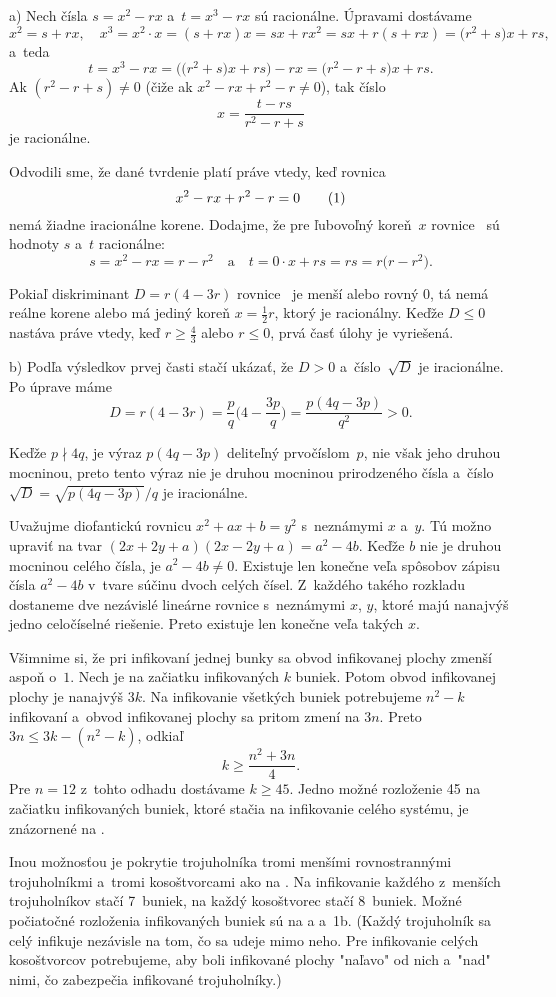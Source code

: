 {%
a) Nech čísla $s=x^2-rx$ a~$t=x^3-rx$ sú racionálne. Úpravami dostávame
$$
x^2=s+rx,\quad x^3=x^2\cdot x=(s+rx)x=sx+rx^2=sx+r(s+rx)=
\bigl(r^2+s\bigr)x+rs,
$$
a~teda
$$
t=x^3-rx=\bigl(\bigl(r^2+s\bigr)x+rs\bigr)-rx=\bigl(r^2-r+s\bigr)x
+rs.
$$
Ak $(r^2-r+s)\ne 0$ (čiže ak $x^2-rx+r^2-r\ne 0$), tak číslo
$$x=\frac{t-rs}{r^2-r+s}$$
je racionálne.

Odvodili sme, že dané tvrdenie platí práve vtedy, keď rovnica
$$
x^2-rx+r^2-r=0
\tag1
$$
nemá žiadne iracionálne korene. Dodajme, že pre ľubovoľný koreň~$x$ rovnice~ sú hodnoty $s$ a~$t$ racionálne:
$$
s=x^2-rx=r-r^2\quad\text{a}\quad
t=0\cdot x+rs=rs=r\bigl(r-r^2\bigr).
$$

Pokiaľ diskriminant $D=r(4-3r)$ rovnice~ je menší alebo rovný $0$, tá
nemá reálne korene alebo má jediný koreň $x=\frac 12r$, ktorý je racionálny. Keďže $D\le 0$ nastáva práve vtedy, keď $r\ge\frac43$ alebo $r\le 0$, prvá časť úlohy je vyriešená.

\smallskip
b)
Podľa výsledkov prvej časti stačí ukázať, že $D>0$ a~číslo~$\sqrt D$ je iracionálne.
Po úprave máme
$$
D=r(4-3r)=\frac{p}{q}\biggl(4-\frac{3p}{q}\biggr)=
\frac{p(4q-3p)}{q^2}>0.
$$

Keďže $p\nmid 4q$, je výraz $p(4q-3p)$ deliteľný prvočíslom~$p$, nie však jeho druhou mocninou, preto tento výraz nie je druhou mocninou prirodzeného čísla a~číslo~$\sqrt D=\sqrt{p(4q-3p)}/q$ je iracionálne.
}

{%
Uvažujme diofantickú rovnicu $x^2+ax+b=y^2$ s~neznámymi $x$ a~$y$. Tú možno upraviť na tvar $(2x+2y+a)(2x-2y+a)=a^2-4b$.
Keďže $b$ nie je druhou mocninou celého čísla, je $a^2-4b\ne 0$.
Existuje len konečne veľa spôsobov zápisu čísla $a^2-4b$ v~tvare súčinu dvoch celých čísel. Z~každého takého rozkladu dostaneme
dve nezávislé lineárne rovnice s~neznámymi $x$, $y$, ktoré majú nanajvýš jedno celočíselné riešenie. Preto existuje len konečne veľa takých $x$.
}

{%
Všimnime si, že pri infikovaní jednej bunky sa obvod infikovanej plochy zmenší aspoň o~$1$. Nech je na začiatku infikovaných $k$ buniek. Potom obvod infikovanej plochy je nanajvýš $3k$. Na infikovanie všetkých buniek potrebujeme $n^2-k$ infikovaní a~obvod infikovanej plochy sa pritom zmení na $3n$. Preto $3n\le 3k-(n^2-k)$, odkiaľ
$$
k\ge \frac{n^2+3n}4.
$$
Pre $n=12$ z~tohto odhadu dostávame $k\ge 45$. Jedno možné rozloženie 45 na začiatku infikovaných buniek, ktoré stačia na infikovanie celého systému, je znázornené na \obr.
%

Inou možnosťou je pokrytie trojuholníka tromi menšími rovnostrannými trojuholníkmi a~tromi kosoštvorcami ako na \obr.
Na infikovanie každého z~menších trojuholníkov stačí 7~buniek, na každý kosoštvorec stačí 8~buniek. Možné počiatočné rozloženia infikovaných buniek sú na \obr{}a a~\obrrcislo1b. (Každý trojuholník sa celý infikuje nezávisle na tom, čo sa udeje mimo neho. Pre infikovanie celých kosoštvorcov potrebujeme, aby boli infikované plochy "naľavo" od nich a~"nad" nimi, čo zabezpečia infikované trojuholníky.)
%
}


